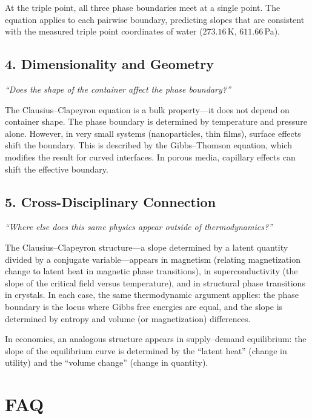 At the triple point, all three phase boundaries meet at a single point. The equation applies to each pairwise boundary, predicting slopes that are consistent with the measured triple point coordinates of water ($273.16$\,K, $611.66$\,Pa).

\subsection*{4. Dimensionality and Geometry}
\textit{``Does the shape of the container affect the phase boundary?''}

The Clausius--Clapeyron equation is a bulk property---it does not depend on container shape. The phase boundary is determined by temperature and pressure alone. However, in very small systems (nanoparticles, thin films), surface effects shift the boundary. This is described by the Gibbs--Thomson equation, which modifies the result for curved interfaces. In porous media, capillary effects can shift the effective boundary.

\subsection*{5. Cross-Disciplinary Connection}
\textit{``Where else does this same physics appear outside of thermodynamics?''}

The Clausius--Clapeyron structure---a slope determined by a latent quantity divided by a conjugate variable---appears in magnetism (relating magnetization change to latent heat in magnetic phase transitions), in superconductivity (the slope of the critical field versus temperature), and in structural phase transitions in crystals. In each case, the same thermodynamic argument applies: the phase boundary is the locus where Gibbs free energies are equal, and the slope is determined by entropy and volume (or magnetization) differences.

In economics, an analogous structure appears in supply--demand equilibrium: the slope of the equilibrium curve is determined by the ``latent heat'' (change in utility) and the ``volume change'' (change in quantity).


\section*{FAQ}

